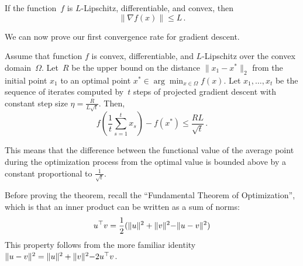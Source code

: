 \begin{fact}
If the function~$f$ is $L$-Lipschitz, differentiable, and convex, then
\[
\|\nabla f(x)\| \leq L\,.
\]
\end{fact}

We can now prove our first convergence rate for gradient descent.

\begin{theorem}
Assume that function $f$ is convex, differentiable, 
and $L$-Lipschitz over the convex domain~$\Omega$. 
Let~$R$ be the upper bound on the distance $\lVert x_1 - x^* \rVert_2$
from the initial point $x_1$ to an optimal point $x^* \in\arg\min_{x \in \Omega} f(x)$.
Let $x_1,\dots,x_t$ be the sequence of iterates computed by~$t$ steps of
projected gradient descent with constant 
step size
$\eta=\frac{R}{L\sqrt{t}}.$
Then, 
\[
f\left(\frac{1}{t}\sum_{s=1}^t x_s\right) - f\left(x^*\right) 
\leq \frac{RL}{\sqrt{t}}\,.
\]
\end{theorem}

This means that the difference between the functional value of the average
point during the optimization process from the optimal value is bounded above
by a constant proportional to $\frac{1}{\sqrt{t}}$.

Before proving the theorem, recall the ``Fundamental Theorem of Optimization'',
which is that an inner product can be written as a sum of norms: 
\begin{equation}
\equationlabel{fundamental-theorem}
u^\trans v = \frac{1}{2}(\lVert u \rVert^2 + \lVert v \lVert^2 - \lVert u - v \rVert^2)
\end{equation}
This property follows from the more familiar identity $\lVert u - v \rVert^2 = \lVert u \rVert^2 + \lVert v \lVert^2 - 2 u^\top v$.

